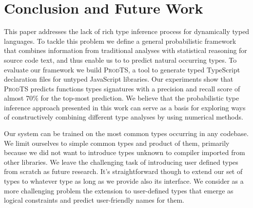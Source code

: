 \documentclass[sigplan,10pt,anonymous]{acmart} %
\newcommand{\prodts}{\textsc{ProdTS}\xspace}
\theoremstyle{plain}
\theoremstyle{remark}
\theoremstyle{definition}
\begin{document}

\section{Conclusion and Future Work} \label{sec:conclusion}
This paper addresses the lack of rich type inference process for
dynamically typed languages. To tackle this problem we define a
general probabilistic framework that combines
information from traditional analyses with statistical reasoning
for source code text, and thus enable us to to predict natural occurring
types. To evaluate our framework we build \prodts{}, a tool to
generate typed TypeScript declaration files for untyped JavaScript
libraries. Our experiments show that \prodts{} predicts functions types
signatures with a precision and recall score of almost 70\% for the top-most
prediction.
We believe that the probabilistic type inference approach presented
in this work can serve as a basis for exploring ways of constructively
combining different type analyses by using numerical methods.

Our system can be trained on the most common types occurring in any codebase.
%
We limit ourselves to simple common types and product of them, primarily because we did not want to introduce types unknown to compiler imported from other libraries.
%
We leave the challenging task of introducing user defined types from scratch as future research. It's straightforward though to extend our set of types to whatever type as long as we provide also its interface. We consider as a more challenging problem the extension to user-defined types that emerge as logical constraints and predict user-friendly names for them.


\end{document}

